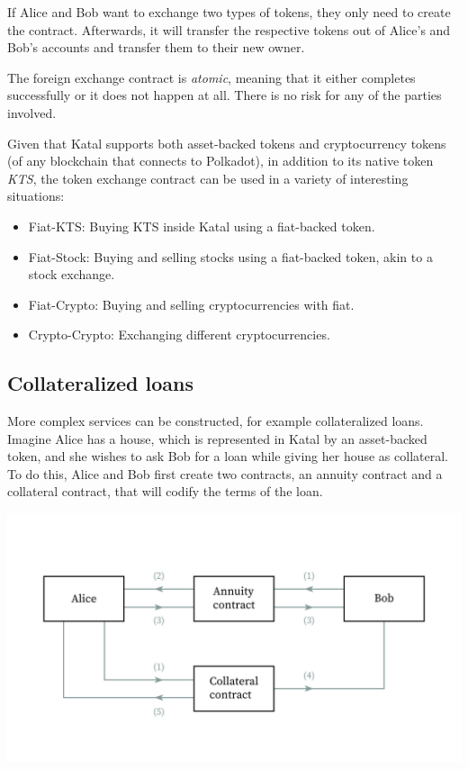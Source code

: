 \documentclass[conference]{IEEEtran}
\begin{document}
If Alice and Bob want to exchange two types of tokens, they only need to create the contract. Afterwards, it will transfer the respective tokens out of Alice's and Bob's accounts and transfer them to their new owner.

The foreign exchange contract is \textit{atomic}, meaning that it either completes successfully or it does not happen at all. There is no risk for any of the parties involved.

Given that Katal supports both asset-backed tokens and cryptocurrency tokens (of any blockchain that connects to Polkadot), in addition to its native token \textit{KTS}, the token exchange contract can be used in a variety of interesting situations:

\begin{itemize}
	\item Fiat-KTS: Buying KTS inside Katal using a fiat-backed token.
	\item Fiat-Stock: Buying and selling stocks using a fiat-backed token, akin to a stock exchange.
	\item Fiat-Crypto: Buying and selling cryptocurrencies with fiat.
	\item Crypto-Crypto: Exchanging different cryptocurrencies.
\end{itemize}

\subsection{Collateralized loans}
More complex services can be constructed, for example collateralized loans. Imagine Alice has a house, which is represented in Katal by an asset-backed token, and she wishes to ask Bob for a loan while giving her house as collateral. To do this, Alice and Bob first create two contracts, an annuity contract and a collateral contract, that will codify the terms of the loan.

\includegraphics[width=\linewidth]{images/collateralized_loan.jpg}
\end{document}
